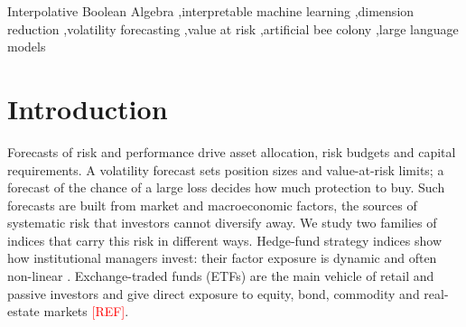 \documentclass[review]{elsarticle}
\begin{document}
\begin{frontmatter}
\begin{abstract}
Forecasts of the risk and performance of financial indices use many market and macroeconomic factors, which are usually compressed into features that have no meaning of their own. We propose a factor reduction that is interpretable by construction. Factors are arranged in economic groups, and each group contributes one logical statement, such as ``credit spreads are widening AND high-yield bonds are NOT rising'', whose degree of truth is computed with Interpolative Boolean Algebra. A linear model combines about nine such statements. The statements are elicited from a large language model under a knowledge cut-off, and an artificial bee colony search refines them. We forecast return, volatility and the probabilities of a large loss and of a large gain for exchange-traded funds and hedge-fund strategy indices. All choices were made on development series; the claims were then fixed and tested in single runs on held-out series. On 21 held-out weekly indices, volatility forecasts improve on HAR by 8.3\,\% at one week and 8.8\,\% at four weeks, and the method outperforms PCA, kernel PCA and an autoencoder on volatility without losing accuracy to any of them on the other targets. Returns and large losses remain unpredictable for every method, also on 23 held-out hedge-fund indices of a second provider. A metaheuristic search for better statements improves the fit on the data used to select them but not the forecasts. A language model explains each forecast in plain words, and its text is accepted only if every number in it matches the fitted model.
\end{abstract}

\begin{keyword}
Interpolative Boolean Algebra \sep interpretable machine learning \sep dimension reduction \sep volatility forecasting \sep value at risk \sep artificial bee colony \sep large language models
\end{keyword}

\end{frontmatter}

\section{Introduction}\label{sec:1}

Forecasts of risk and performance drive asset allocation, risk budgets and capital requirements. A volatility forecast sets position sizes and value-at-risk limits; a forecast of the chance of a large loss decides how much protection to buy. Such forecasts are built from market and macroeconomic factors, the sources of systematic risk that investors cannot diversify away. We study two families of indices that carry this risk in different ways. Hedge-fund strategy indices show how institutional managers invest: their factor exposure is dynamic and often non-linear \citep{Fung2004}. Exchange-traded funds (ETFs) are the main vehicle of retail and passive investors and give direct exposure to equity, bond, commodity and real-estate markets \textcolor{red}{[REF]}.
\end{document}

